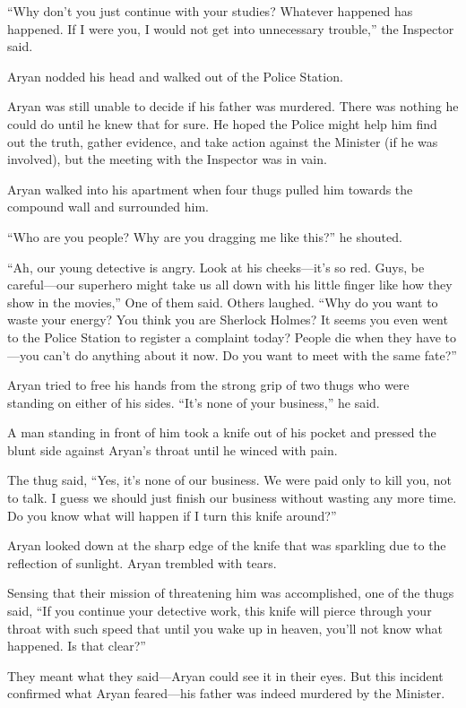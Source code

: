 “Why don't you just continue with your studies? Whatever happened has happened.
If I were you, I would not get into unnecessary trouble,” the Inspector said.

Aryan nodded his head and walked out of the Police Station.

Aryan was still unable to decide if his father was murdered. There was nothing
he could do until he knew that for sure. He hoped the Police might help him find
out the truth, gather evidence, and take action against the Minister (if he was
involved), but the meeting with the Inspector was in vain.

Aryan walked into his apartment when four thugs pulled him towards the compound
wall and surrounded him.

“Who are you people? Why are you dragging me like this?” he shouted.

“Ah, our young detective is angry. Look at his cheeks—it's so red. Guys, be
careful—our superhero might take us all down with his little finger like how
they show in the movies,” One of them said. Others laughed. “Why do you want to
waste your energy? You think you are Sherlock Holmes? It seems you even went to
the Police Station to register a complaint today? People die when they have
to—you can't do anything about it now. Do you want to meet with the same fate?”

Aryan tried to free his hands from the strong grip of two thugs who were
standing on either of his sides. “It's none of your business,” he said.

A man standing in front of him took a knife out of his pocket and pressed the
blunt side against Aryan's throat until he winced with pain.

The thug said, “Yes, it's none of our business. We were paid only to kill you,
not to talk. I guess we should just finish our business without wasting any more
time. Do you know what will happen if I turn this knife around?”

Aryan looked down at the sharp edge of the knife that was sparkling due to the
reflection of sunlight. Aryan trembled with tears.

Sensing that their mission of threatening him was accomplished, one of the thugs
said, “If you continue your detective work, this knife will pierce through your
throat with such speed that until you wake up in heaven, you'll not know what
happened. Is that clear?”

They meant what they said—Aryan could see it in their eyes. But this incident
confirmed what Aryan feared—his father was indeed murdered by the Minister.